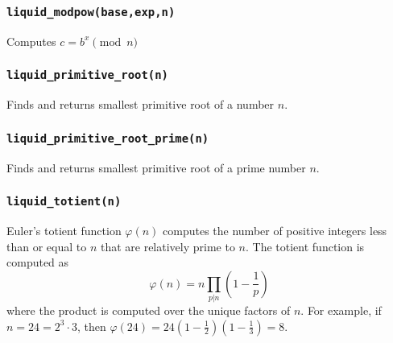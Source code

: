 \subsubsection{{\tt liquid\_modpow(base,exp,n)}}
\label{module:math:mod:liquid_modpow}
Computes $c = b^x \pmod n$

\subsubsection{{\tt liquid\_primitive\_root(n)}}
\label{module:math:mod:liquid_primitive_root}
Finds and returns smallest primitive root of a number $n$.

\subsubsection{{\tt liquid\_primitive\_root\_prime(n)}}
\label{module:math:mod:liquid_primitive_root_prime}
Finds and returns smallest primitive root of a prime number $n$.

\subsubsection{{\tt liquid\_totient(n)}}
\label{module:math:mod:liquid_totient}
Euler's totient function $\varphi(n)$ computes the number of positive
integers less than or equal to $n$ that are relatively prime to $n$.
The totient function is computed as
\[
    \varphi(n) = n \prod_{p|n} {\left(1 - \frac{1}{p}\right)}
\]
where the product is computed over the unique factors of $n$.
For example, if $n=24 = 2^3 \cdot 3$, then
$\varphi(24) =
24\left(1-\frac{1}{2}\right)\left(1-\frac{1}{3}\right)=8$.
